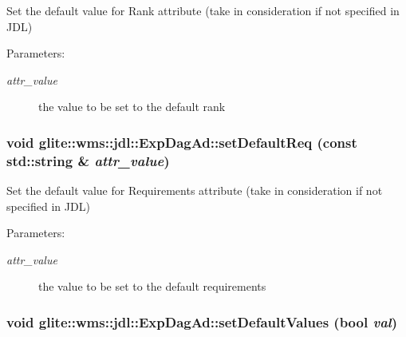 Set the default value for Rank attribute (take in consideration if not specified in JDL) \begin{Desc}
\item[Parameters:]
\begin{description}
\item[{\em attr\_\-value}]the value to be set to the default rank\end{description}
\end{Desc}
\hypertarget{classglite_1_1wms_1_1jdl_1_1ExpDagAd_a25}{
\subsubsection[setDefaultReq]{\setlength{\rightskip}{0pt plus 5cm}void glite::wms::jdl::Exp\-Dag\-Ad::set\-Default\-Req (const std::string \& {\em attr\_\-value})}}
\label{classglite_1_1wms_1_1jdl_1_1ExpDagAd_a25}


Set the default value for Requirements attribute (take in consideration if not specified in JDL) \begin{Desc}
\item[Parameters:]
\begin{description}
\item[{\em attr\_\-value}]the value to be set to the default requirements\end{description}
\end{Desc}
\hypertarget{classglite_1_1wms_1_1jdl_1_1ExpDagAd_a26}{
\subsubsection[setDefaultValues]{\setlength{\rightskip}{0pt plus 5cm}void glite::wms::jdl::Exp\-Dag\-Ad::set\-Default\-Values (bool {\em val})}}
\label{classglite_1_1wms_1_1jdl_1_1ExpDagAd_a26}


